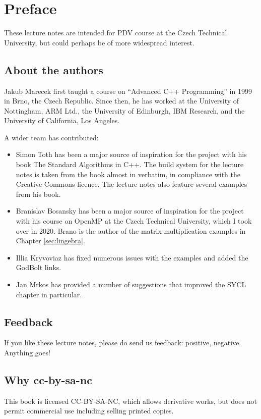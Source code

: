 \chapter{Preface}

These lecture notes are intended for PDV course at the Czech Technical University, but could perhaps be of more widespread interest. 

\section*{About the authors}

Jakub Marecek first taught a course on ``Advanced C++ Programming'' in 1999 in Brno, the Czech Republic. Since then, he has worked at the University of Nottingham, ARM Ltd., the University of Edinburgh, IBM Research, and the University of California, Los Angeles.

A wider team has contributed:
\begin{itemize}
\item Simon Toth has been a major source of inspiration for the project with his book The Standard Algorithms in C++. The build system for the lecture notes is taken from the book almost in verbatim, in compliance with the Creative Commons licence. The lecture notes also feature several examples from his book. 
\item Branislav Bosansky has been a major source of inspiration for the project with his course on OpenMP at the Czech Technical University, which I took over in 2020. Brano is the author of the matrix-multiplication examples in Chapter \ref{sec:lingebra}. 
\item Illia Kryvoviaz has fixed numerous issues with the examples and added the GodBolt links. 
\item Jan Mrkos has provided a number of suggestions that improved the SYCL chapter in particular. 
\end{itemize}

\section*{Feedback}

If you like these lecture notes, please do send us feedback: positive, negative. Anything goes!

\section*{Why cc-by-sa-nc}

This book is licensed CC-BY-SA-NC, which allows derivative works, but does not permit commercial use including selling printed copies. 